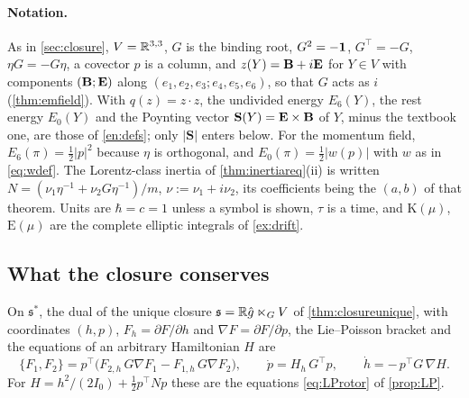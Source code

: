 \paragraph{Notation.} As in \cref{sec:closure}, $V=\mathbb{R}^{3,3}$, $G$ is the binding root, $G^2=-\mathbf 1$, $G^{\!\top}=-G$, $\eta G=-G\eta$, a covector
$p$ is a column, and $z(Y)=\mathbf B+i\mathbf E$ for $Y\in V$ with components $(\mathbf B;\mathbf E)$ along $(e_1,e_2,e_3;e_4,e_5,e_6)$, so that $G$ acts as $i$
(\cref{thm:emfield}). With $q(z)=z\cdot z$, the undivided energy $E_6(Y)$, the rest energy $E_0(Y)$ and the Poynting vector
$\mathbf S(Y)=\mathbf E\times\mathbf B$ of $Y$, minus the textbook one, are those of \eqref{en:defs}; only $|\mathbf S|$ enters below. For the momentum field, $E_6(\pi)=\tfrac12|p|^2$ because $\eta$
is orthogonal, and $E_0(\pi)=\tfrac12|w(p)|$ with $w$ as in \eqref{eq:wdef}. The Lorentz-class inertia of \cref{thm:inertiareq}(ii) is written
$N=(\nu_1\eta^{-1}+\nu_2G\eta^{-1})/m$, $\nu:=\nu_1+i\nu_2$, its coefficients being the $(a,b)$ of that theorem. Units are $\hbar=c=1$ unless a
symbol is shown, $\tau$ is a time, and $\mathrm K(\mu)$, $\mathrm E(\mu)$ are the complete elliptic integrals of \cref{ex:drift}.

\subsection{What the closure conserves}
\label{sec:restconserve}

On $\mathfrak s^*$, the dual of the unique closure $\mathfrak s=\mathbb{R}\hat g\ltimes_GV$ of \cref{thm:closureunique}, with coordinates $(h,p)$,
$F_h=\partial F/\partial h$ and $\nabla F=\partial F/\partial p$, the Lie--Poisson bracket and the equations of an arbitrary Hamiltonian $H$ are
\begin{equation}
\label{eq:restLPgen}
\{F_1,F_2\}=p^{\!\top}\bigl(F_{2,h}\,G\nabla F_1-F_{1,h}\,G\nabla F_2\bigr),\qquad
\dot p=H_h\,G^{\!\top}p,\qquad \dot h=-\,p^{\!\top}G\,\nabla H .
\end{equation}
For $H=h^2/(2I_0)+\tfrac12p^{\!\top}Np$ these are the equations \eqref{eq:LProtor} of \cref{prop:LP}.

